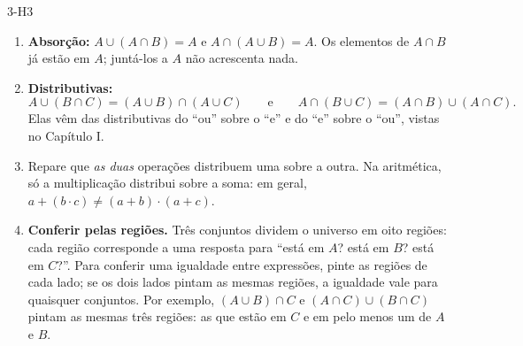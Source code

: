\begin{construcao}{3-H3}
\begin{enumerate}[label=(\arabic*)]
  \item \textbf{Absorção:} $A\cup(A\cap B)=A$ e $A\cap(A\cup B)=A$. Os elementos de $A\cap B$ já estão em $A$; juntá-los a $A$ não acrescenta nada.
  \item \textbf{Distributivas:}
\[
A\cup(B\cap C)=(A\cup B)\cap(A\cup C)\qquad\text{e}\qquad A\cap(B\cup C)=(A\cap B)\cup(A\cap C).
\]
Elas vêm das distributivas do \enquote{ou} sobre o \enquote{e} e do \enquote{e} sobre o \enquote{ou}, vistas no Capítulo I.
  \item Repare que \emph{as duas} operações distribuem uma sobre a outra. Na aritmética, só a multiplicação distribui sobre a soma: em geral, $a+(b\cdot c)\neq(a+b)\cdot(a+c)$.
  \item \textbf{Conferir pelas regiões.} Três conjuntos dividem o universo em oito regiões: cada região corresponde a uma resposta para \enquote{está em $A$? está em $B$? está em $C$?}. Para conferir uma igualdade entre expressões, pinte as regiões de cada lado; se os dois lados pintam as mesmas regiões, a igualdade vale para quaisquer conjuntos. Por exemplo, $(A\cup B)\cap C$ e $(A\cap C)\cup(B\cap C)$ pintam as mesmas três regiões: as que estão em $C$ e em pelo menos um de $A$ e $B$.
\begin{center}
\end{center}
\end{enumerate}
\end{construcao}

